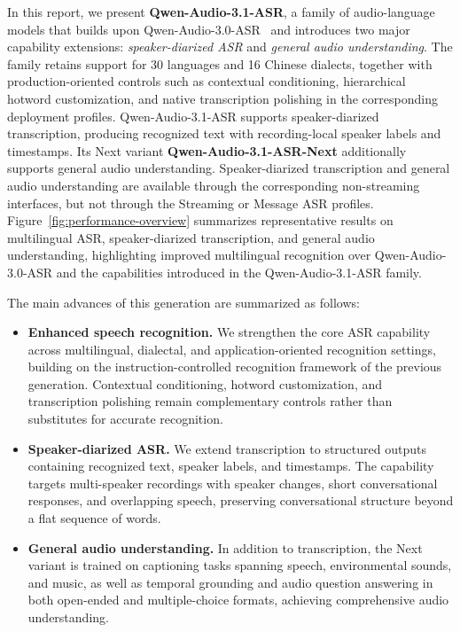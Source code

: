 \documentclass{article}
\begin{document}
In this report, we present \textbf{Qwen-Audio-3.1-ASR}, a family of audio-language models that builds upon Qwen-Audio-3.0-ASR~\citep{qwen_audio_3_0_asr} and introduces two major capability extensions: \textit{speaker-diarized ASR} and \textit{general audio understanding}. The family retains support for 30 languages and 16 Chinese dialects, together with production-oriented controls such as contextual conditioning, hierarchical hotword customization, and native transcription polishing in the corresponding deployment profiles. Qwen-Audio-3.1-ASR supports speaker-diarized transcription, producing recognized text with recording-local speaker labels and timestamps. Its Next variant \textbf{Qwen-Audio-3.1-ASR-Next} additionally supports general audio understanding. Speaker-diarized transcription and general audio understanding are available through the corresponding non-streaming interfaces, but not through the Streaming or Message ASR profiles. Figure~\ref{fig:performance-overview} summarizes representative results on multilingual ASR, speaker-diarized transcription, and general audio understanding, highlighting improved multilingual recognition over Qwen-Audio-3.0-ASR and the capabilities introduced in the Qwen-Audio-3.1-ASR family.

The main advances of this generation are summarized as follows:
\begin{itemize}[leftmargin=*,noitemsep]
    \item \textbf{Enhanced speech recognition.} We strengthen the core ASR capability across multilingual, dialectal, and application-oriented recognition settings, building on the instruction-controlled recognition framework of the previous generation. Contextual conditioning, hotword customization, and transcription polishing remain complementary controls rather than substitutes for accurate recognition.

    \item \textbf{Speaker-diarized ASR.} We extend transcription to structured outputs containing recognized text, speaker labels, and timestamps. The capability targets multi-speaker recordings with speaker changes, short conversational responses, and overlapping speech, preserving conversational structure beyond a flat sequence of words.

    \item \textbf{General audio understanding.} In addition to transcription, the Next variant is trained on captioning tasks spanning speech, environmental sounds, and music, as well as temporal grounding and audio question answering in both open-ended and multiple-choice formats, achieving comprehensive audio understanding.
\end{itemize}
\end{document}
